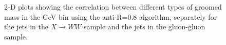 \begin{figure}
\begin{center}
\caption{2-D plots showing the correlation between different types of
  groomed mass in the  GeV bin using the anti-\kT R=0.8
  algorithm, separately for the jets in the $X \rightarrow WW$ sample and the
  jets in the gluon-gluon sample.}
\label{fig:pt500_2d_massGG_AKt_R08}
\end{center}
\end{figure}


%
%





